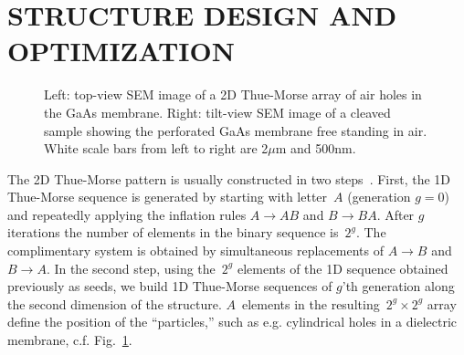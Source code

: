 \section{STRUCTURE DESIGN AND OPTIMIZATION}
\label{sec:design}

\begin{figure}
\caption[Top-view SEM image of a 2D Thue-Morse array of air holes in the GaAs membrane.]{\label{fig:experimental_structure}
Left: top-view SEM image of a 2D Thue-Morse array of air holes in the GaAs membrane. Right: tilt-view SEM image of a cleaved sample showing the perforated GaAs membrane free standing in air. White scale bars from left to right are 2$\mu$m and 500nm.}
\end{figure}

The 2D Thue-Morse pattern is usually constructed in two steps~\cite{2008_Negro}. First, the 1D Thue-Morse sequence is generated by starting with letter~$A$ (generation $g=0$) and repeatedly applying the inflation rules $A\rightarrow AB$ and $B\rightarrow BA$. After $g$ iterations the number of elements in the binary sequence is~$2^g$. The complimentary system is obtained by simultaneous replacements of $A\rightarrow B$ and $B\rightarrow A$. In the second step, using the~$2^g$ elements of the 1D sequence obtained previously as seeds, we build 1D Thue-Morse sequences of $g$'th generation along the second dimension of the structure. $A$~elements in the resulting~$2^g\times2^g$ array define the position of the ``particles,'' such as e.g. cylindrical holes in a dielectric membrane, c.f. Fig.~\ref{fig:experimental_structure}. 

